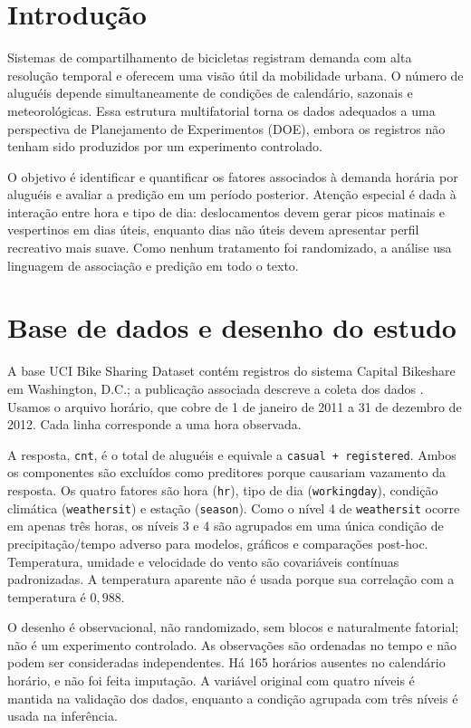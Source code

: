 \documentclass[12pt]{article}
\begin{document}
\section{Introdução}

Sistemas de compartilhamento de bicicletas registram demanda com alta resolução
temporal e oferecem uma visão útil da mobilidade urbana. O número de aluguéis
depende simultaneamente de condições de calendário, sazonais e meteorológicas.
Essa estrutura multifatorial torna os dados adequados a uma perspectiva de
Planejamento de Experimentos (DOE), embora os registros não tenham sido
produzidos por um experimento controlado.

O objetivo é identificar e quantificar os fatores associados à demanda horária
por aluguéis e avaliar a predição em um período posterior. Atenção especial é
dada à interação entre hora e tipo de dia: deslocamentos devem gerar picos
matinais e vespertinos em dias úteis, enquanto dias não úteis devem apresentar
perfil recreativo mais suave. Como nenhum tratamento foi randomizado, a análise
usa linguagem de associação e predição em todo o texto.

\section{Base de dados e desenho do estudo}

A base UCI Bike Sharing Dataset \cite{uci-bike-sharing} contém registros do
sistema Capital Bikeshare em Washington, D.C.; a publicação associada descreve a
coleta dos dados \cite{fanaee2013}. Usamos o arquivo horário, que cobre de 1 de
janeiro de 2011 a 31 de dezembro de 2012. Cada linha corresponde a uma hora
observada.

A resposta, \texttt{cnt}, é o total de aluguéis e equivale a
\texttt{casual + registered}. Ambos os componentes são excluídos como
preditores porque causariam vazamento da resposta. Os quatro fatores são hora
(\texttt{hr}), tipo de dia (\texttt{workingday}), condição climática
(\texttt{weathersit}) e estação (\texttt{season}). Como o nível 4 de
\texttt{weathersit} ocorre em apenas três horas, os níveis 3 e 4 são agrupados
em uma única condição de precipitação/tempo adverso para modelos, gráficos e
comparações post-hoc. Temperatura, umidade e velocidade do vento são covariáveis
contínuas padronizadas. A temperatura
aparente não é usada porque sua correlação com a temperatura é $0{,}988$.

O desenho é observacional, não randomizado, sem blocos e naturalmente fatorial;
não é um experimento controlado. As observações são ordenadas no tempo e não
podem ser consideradas independentes. Há 165 horários ausentes no calendário
horário, e não foi feita imputação. A variável original com quatro níveis é
mantida na validação dos dados, enquanto a condição agrupada com três níveis é
usada na inferência.
\end{document}
